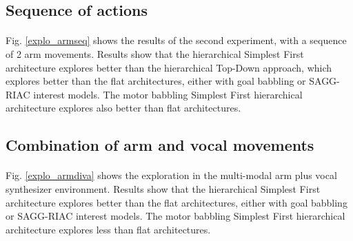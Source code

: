 \documentclass[12pt]{article}
\begin{document}
	


	\subsection{Sequence of actions}

		\paragraph{}
		Fig. \ref{explo_armseq} shows the results of the second experiment, with a sequence of 2 arm movements.
		Results show that the hierarchical Simplest First architecture explores better than the hierarchical Top-Down approach, which explores better
		than the flat architectures, either with goal babbling or SAGG-RIAC interest models.
		The motor babbling Simplest First hierarchical architecture explores also better than flat architectures.



	\subsection{Combination of arm and vocal movements}

		\paragraph{}
		Fig. \ref{explo_armdiva} shows the exploration in the multi-modal arm plus vocal synthesizer environment.
		Results show that the hierarchical Simplest First architecture explores better than the flat architectures, 
		either with goal babbling or SAGG-RIAC interest models.
		The motor babbling Simplest First hierarchical architecture explores less than flat architectures.
\end{document}
